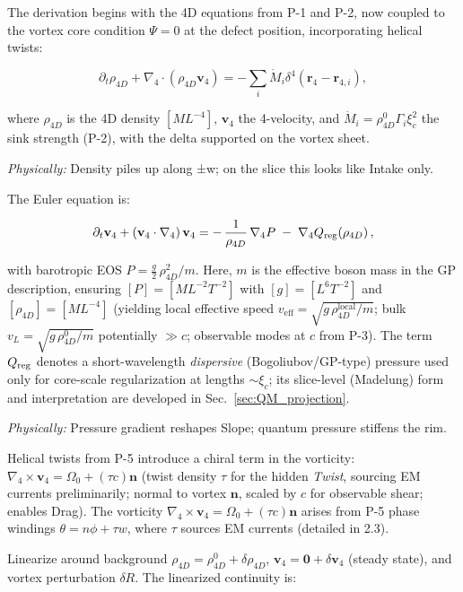 The derivation begins with the 4D equations from P-1 and P-2, now coupled to the vortex core condition $\Psi=0$ at the defect position, incorporating helical twists:

\begin{equation}
\partial_t \rho_{4D} + \nabla_4 \cdot (\rho_{4D} \mathbf{v}_4) = -\sum_i \dot{M}_i \delta^4(\mathbf{r}_4 - \mathbf{r}_{4,i}),
\end{equation}

where $\rho_{4D}$ is the 4D density $[M L^{-4}]$, $\mathbf{v}_4$ the 4-velocity, and $\dot{M}_i = \rho_{4D}^0 \Gamma_i \xi_c^2$ the sink strength (P-2), with the delta supported on the vortex sheet.

\textit{Physically:} Density piles up along ±w; on the slice this looks like Intake only.

The Euler equation is:

\begin{equation}
\partial_t \mathbf{v}_4 + (\mathbf{v}_4 \cdot \nabla_4)\,\mathbf{v}_4
= -\,\frac{1}{\rho_{4D}}\,\nabla_4 P \;-\; \nabla_4 Q_{\rm reg}(\rho_{4D})\,,
\end{equation}

with barotropic EOS $P=\tfrac{g}{2}\,\rho_{4D}^2/m$. Here, $m$ is the effective boson mass in the GP description, ensuring $[P]=[M L^{-2}T^{-2}]$ with $[g]=[L^6T^{-2}]$ and $[\rho_{4D}]=[M L^{-4}]$ (yielding local effective speed $v_{\text{eff}}=\sqrt{g\,\rho_{4D}^{\text{local}}/m}$; bulk $v_L=\sqrt{g\,\rho_{4D}^0/m}$ potentially $\gg c$; observable modes at $c$ from P-3). The term $Q_{\rm reg}$ denotes a short-wavelength \emph{dispersive} (Bogoliubov/GP-type) pressure used only for core-scale regularization at lengths $\sim\xi_c$; its slice-level (Madelung) form and interpretation are developed in Sec.~\ref{sec:QM_projection}.

\textit{Physically:} Pressure gradient reshapes Slope; quantum pressure stiffens the rim.

Helical twists from P-5 introduce a chiral term in the vorticity: $\nabla_4 \times \mathbf{v}_4 = \Omega_0 + (\tau c) \mathbf{n}$ (twist density $\tau$ for the hidden \emph{Twist}, sourcing EM currents preliminarily; normal to vortex $\mathbf{n}$, scaled by $c$ for observable shear; enables Drag). The vorticity $\nabla_4 \times \mathbf{v}_4 = \Omega_0 + (\tau c) \mathbf{n}$ arises from P-5 phase windings $\theta = n\phi + \tau w$, where $\tau$ sources EM currents (detailed in 2.3).

Linearize around background $\rho_{4D} = \rho_{4D}^0 + \delta \rho_{4D}$, $\mathbf{v}_4 = \mathbf{0} + \delta \mathbf{v}_4$ (steady state), and vortex perturbation $\delta R$. The linearized continuity is:

